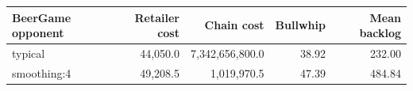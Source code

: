 \begin{tabular}{lrrrr}
\toprule
BeerGame opponent & Retailer cost & Chain cost & Bullwhip & Mean backlog \\
\midrule
typical & 44,050.0 & 7,342,656,800.0 & 38.92 & 232.00 \\
smoothing:4 & 49,208.5 & 1,019,970.5 & 47.39 & 484.84 \\
\bottomrule
\end{tabular}
